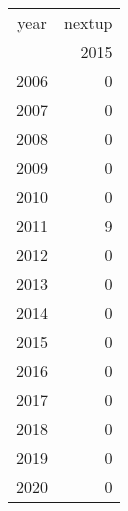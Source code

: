 \footnotesize\begin{tabular}[t]{lr}
\toprule
\multicolumn{1}{c}{year} & \multicolumn{1}{c}{nextup} \\
\cmidrule(l{3pt}r{3pt}){1-1} \cmidrule(l{3pt}r{3pt}){2-2}
  & 2015\\
\midrule
2006 & 0\\
2007 & 0\\
2008 & 0\\
2009 & 0\\
2010 & 0\\
2011 & 9\\
2012 & 0\\
2013 & 0\\
2014 & 0\\
2015 & 0\\
2016 & 0\\
2017 & 0\\
2018 & 0\\
2019 & 0\\
2020 & 0\\
\bottomrule
\end{tabular}
